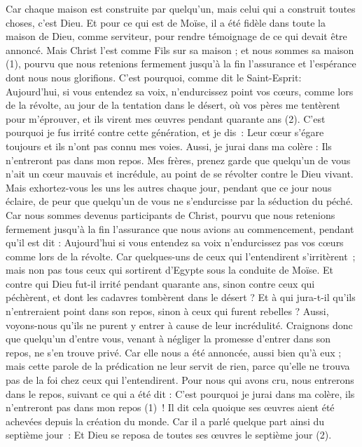 \begin{multicols}{2}
Car chaque maison est construite par quelqu'un, mais celui qui a construit toutes choses, c'est Dieu.
Et pour ce qui est de Moïse, il a été fidèle dans toute la maison de Dieu, comme serviteur, pour rendre témoignage de ce qui devait être annoncé.
Mais Christ l’est comme Fils sur sa maison ; et nous sommes sa maison (1), pourvu que nous retenions fermement jusqu’à la fin l'assurance et l'espérance dont nous nous glorifions.
C'est pourquoi, comme dit le Saint-Esprit: Aujourd'hui, si vous entendez sa voix,
n'endurcissez point vos cœurs, comme lors de la révolte, au jour de la tentation dans le désert,
où vos pères me tentèrent pour m’éprouver, et ils virent mes œuvres pendant quarante ans (2).
C'est pourquoi je fus irrité contre cette génération, et je dis : Leur cœur s'égare toujours et ils n'ont pas connu mes voies.
Aussi, je jurai dans ma colère : Ils n’entreront pas dans mon repos.
Mes frères, prenez garde que quelqu'un de vous n’ait un cœur mauvais et incrédule, au point de se révolter contre le Dieu vivant.
Mais exhortez-vous les uns les autres chaque jour, pendant que ce jour nous éclaire, de peur que quelqu'un de vous ne s'endurcisse par la séduction du péché.
Car nous sommes devenus participants de Christ, pourvu que nous retenions fermement jusqu'à la fin l’assurance que nous avions au commencement,
pendant qu'il est dit : Aujourd'hui si vous entendez sa voix n'endurcissez pas vos cœurs comme lors de la révolte.
Car quelques-uns de ceux qui l’entendirent s’irritèrent ; mais non pas tous ceux qui sortirent d’Egypte sous la conduite de Moïse.
Et contre qui Dieu fut-il irrité pendant quarante ans, sinon contre ceux qui péchèrent, et dont les cadavres tombèrent dans le désert ?
Et à qui jura-t-il qu'ils n'entreraient point dans son repos, sinon à ceux qui furent rebelles ?
Aussi, voyons-nous qu'ils ne purent y entrer à cause de leur incrédulité.
\VerseOne{}Craignons donc que quelqu'un d'entre vous, venant à négliger la promesse d'entrer dans son repos, ne s'en trouve privé.
Car elle nous a été annoncée, aussi bien qu’à eux ; mais cette parole de la prédication ne leur servit de rien, parce qu'elle ne trouva pas de la foi chez ceux qui l’entendirent.
Pour nous qui avons cru, nous entrerons dans le repos, suivant ce qui a été dit : C'est pourquoi je jurai dans ma colère, ils n’entreront pas dans mon repos (1) ! Il dit cela quoique ses œuvres aient été achevées depuis la création du monde.
Car il a parlé quelque part ainsi du septième jour : Et Dieu se reposa de toutes ses œuvres le septième jour (2).

\end{multicols}
